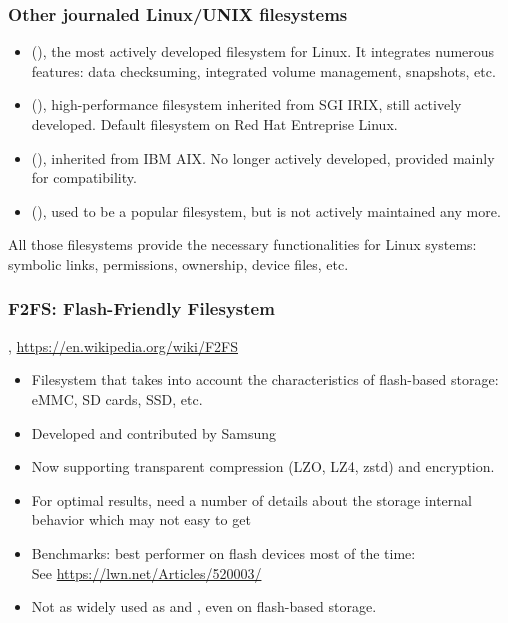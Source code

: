 \begin{frame}
  \frametitle{Other journaled Linux/UNIX filesystems}
  \begin{itemize}
  \item {} (), the most actively developed filesystem
    for Linux. It integrates numerous features: data checksuming,
    integrated volume management, snapshots, etc.
  \item {} (), high-performance filesystem inherited from SGI
    IRIX, still actively developed. Default filesystem on Red Hat Entreprise Linux.
  \item {} (), inherited from IBM AIX. No longer actively
    developed, provided mainly for compatibility.
  \item {} (), used to be a
    popular filesystem, but is not actively maintained any more.
  \end{itemize}
  All those filesystems provide the necessary functionalities for
  Linux systems: symbolic links, permissions, ownership, device files,
  etc.
\end{frame}

\begin{frame}
  \frametitle{F2FS: Flash-Friendly Filesystem}
  , \url{https://en.wikipedia.org/wiki/F2FS}
  \begin{itemize}
  \item Filesystem that takes into account the characteristics of
    flash-based storage: eMMC, SD cards, SSD, etc.
  \item Developed and contributed by Samsung
  \item Now supporting transparent compression (LZO, LZ4, zstd) and
        encryption.
  \item For optimal results, need a number of details about the
    storage internal behavior which may not easy to get
  \item Benchmarks: best performer on flash devices most of the time: \\
        See \url{https://lwn.net/Articles/520003/}
  \item Not as widely used as  and , even on flash-based
    storage.
  \end{itemize}
\end{frame}


